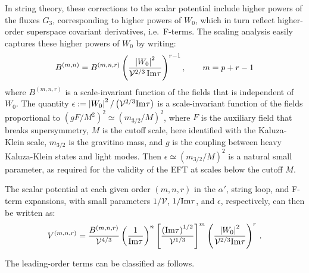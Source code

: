 \documentclass[12pt,a4wide]{article}
\def\V{\mathcal{V}}
\def\be{\begin{equation}}
\def\ee{\end{equation}}
\begin{document}
In string theory, these corrections to the scalar potential include higher powers of the fluxes  $G_3$, corresponding to higher powers of $W_0$, which in turn reflect higher-order superspace covariant derivatives, i.e.~F-terms. The scaling analysis easily captures these higher powers of $W_0$ by writing:
\be
B^{(m,n)}=B^{(m,n,r)}\left(\frac{\left |W_0\right |^2}{\V^{2/3}\,\hbox{Im}\tau}\right)^{r-1},\qquad m=p+r-1
\ee 
where $ B^{(m,n,r)}$ is a scale-invariant function of the fields that is independent of $W_0$. 
The quantity  $\epsilon :=\left |W_0\right |^2/\left(\V^{2/3}\hbox{Im}\tau \right)$ is a scale-invariant function of the fields proportional to   $\left(gF/M^2 \right)^2\simeq \left(m_{3/2}/M\right)^2$, where $F$ is the auxiliary field that breaks supersymmetry,  $M$ is the cutoff scale, here identified with the Kaluza-Klein scale, $m_{3/2}$ is the gravitino mass, and $g$ is the coupling  between heavy Kaluza-Klein states and light modes. Then $\epsilon \simeq (m_{3/2}/M)^2$  is a natural small parameter,  as  required for the validity of the EFT at scales below the cutoff $M$. 

The scalar potential at each given order $(m,n,r)$ in the $\alpha'$, string loop, and F-term expansions, 
with
small parameters $1/\V$, $1/\hbox{Im}\tau$, and $\epsilon$, respectively, 
can then be written as: 
\be \label{eq:vmnr}
V^{(m,n,r)}=\frac{B^{(m,n,r)}}{\V^{4/3}}\left(\frac{1}{\hbox{Im}\tau} \right)^n \left[\frac{\left(\hbox{Im}\tau\right)^{1/2}}{\V^{1/3}}\right]^m \left(\frac{\left |W_0\right |^2}{\V^{2/3} \hbox{Im}\tau}\right)^r\,.
\ee 

The leading-order terms can be classified as follows.
\end{document}
